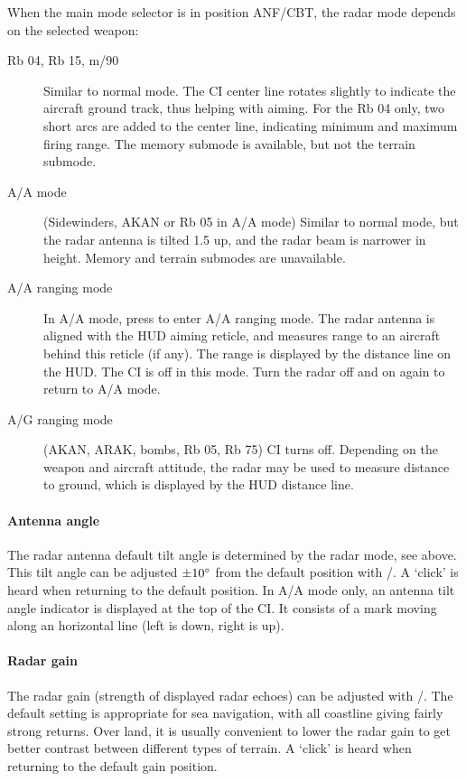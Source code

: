 When the main mode selector is in position ANF/CBT, the radar mode depends on the selected weapon:
\begin{description}
  \item[Rb 04, Rb 15, m/90] Similar to normal mode.
    The CI center line rotates slightly to indicate the aircraft ground track, thus helping with aiming.
    For the Rb 04 only, two short arcs are added to the center line, indicating minimum and maximum firing range.
    The memory submode is available, but not the terrain submode.
  \item[A/A mode] (Sidewinders, AKAN or Rb 05 in A/A mode)
    Similar to normal mode, but the radar antenna is tilted 1.5\textdegree{} up,
    and the radar beam is narrower in height.
    Memory and terrain submodes are unavailable.
  \item[A/A ranging mode] In A/A mode, press  to enter A/A ranging mode.
    The radar antenna is aligned with the HUD aiming reticle,
    and measures range to an aircraft behind this reticle (if any).
    The range is displayed by the distance line on the HUD.
    The CI is off in this mode. Turn the radar off and on again to return to A/A mode.
  \item[A/G ranging mode] (AKAN, ARAK, bombs, Rb 05, Rb 75)
    CI turns off. Depending on the weapon and aircraft attitude,
    the radar may be used to measure distance to ground, which is displayed by the HUD distance line.
\end{description}

\paragraph{Antenna angle}
The radar antenna default tilt angle is determined by the radar mode, see above.
This tilt angle can be adjusted $\pm 10 \degree$ from the default position with \keys{<}/\keys{>}.
A `click' is heard when returning to the default position.
In A/A mode only, an antenna tilt angle indicator is displayed at the top of the CI.
It consists of a mark moving along an horizontal line (left is down, right is up).

\paragraph{Radar gain}
The radar gain (strength of displayed radar echoes) can be adjusted with \keys{\{}/\keys{\}}.
The default setting is appropriate for sea navigation, with all coastline giving fairly strong returns.
Over land, it is usually convenient to lower the radar gain
to get better contrast between different types of terrain.
A `click' is heard when returning to the default gain position.


